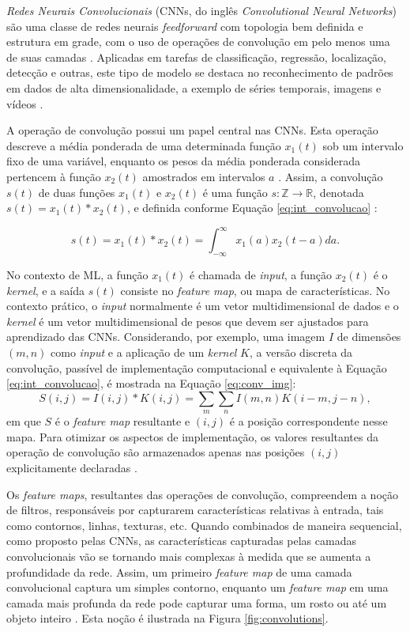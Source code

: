 \emph{Redes Neurais Convolucionais} (CNNs, do inglês \emph{Convolutional Neural Networks}) são uma classe de redes neurais \emph{feedforward} com topologia bem definida e estrutura em grade, com o uso de operações de convolução em pelo menos uma de suas camadas \cite{goodfellow2016deep}. Aplicadas em tarefas de classificação, regressão, localização, detecção e outras, este tipo de modelo se destaca no reconhecimento de padrões em dados de alta dimensionalidade, a exemplo de séries temporais, imagens e vídeos \cite{Khan:Livro}.

A operação de convolução possui um papel central nas CNNs. Esta operação descreve a média ponderada de uma determinada função $x_1(t)$ sob um intervalo fixo de uma variável, enquanto os pesos da média ponderada considerada pertencem à função $x_2(t)$ amostrados em intervalos $a$ \cite{bracewell1986fourier}. Assim, a convolução $s(t)$ de duas funções $x_1(t)$ e $x_2(t)$ é uma função $s: \mathds{Z} \rightarrow \mathds{R}$, denotada $s(t) = x_1(t) * x_2(t)$, e definida conforme Equação \ref{eq:int_convolucao} \cite{lathi2006sinais}:

\begin{equation}\label{eq:int_convolucao}
s(t) = x_1(t) * x_2(t) = \int_{-\infty}^{\infty} x_1(a) x_2(t-a)da.
\end{equation}

No contexto de ML, a função $x_1(t)$ é chamada de \emph{input}, a função $x_2(t)$ é o \emph{kernel}, e a saída $s(t)$ consiste no \emph{feature map}, ou mapa de características. No contexto prático, o \emph{input} normalmente é um vetor multidimensional de dados e o \emph{kernel} é um vetor multidimensional de pesos que devem ser ajustados para aprendizado das CNNs. Considerando, por exemplo, uma imagem $I$ de dimensões $(m,n)$ como \emph{input} e a aplicação de um \emph{kernel} $K$, a versão discreta da convolução, passível de implementação computacional e equivalente à Equação \ref{eq:int_convolucao}, é mostrada na Equação \ref{eq:conv_img}:
\begin{equation}
 S(i,j) = I(i,j)*K(i,j) = \sum_{m}\sum_{n}I(m,n)K(i-m,j-n),\label{eq:conv_img}
\end{equation}
em que $S$ é o \emph{feature map} resultante e $(i,j)$ é a posição correspondente nesse mapa. Para otimizar os aspectos de implementação, os valores resultantes da operação de convolução são armazenados apenas nas posições $(i,j)$ explicitamente declaradas \cite{goodfellow2016deep}.

Os \emph{feature maps}, resultantes das operações de convolução, compreendem a noção de filtros, responsáveis por capturarem características relativas à entrada, tais como contornos, linhas, texturas, etc. Quando combinados de maneira sequencial, como proposto pelas CNNs, as características capturadas pelas camadas convolucionais vão se tornando mais complexas à medida que se aumenta a profundidade da rede. Assim, um primeiro \emph{feature map} de uma camada convolucional captura um simples contorno, enquanto um \emph{feature map} em uma camada mais profunda da rede pode capturar uma forma, um rosto ou até um objeto inteiro \cite{Buduma:Livro}. Esta noção é ilustrada na Figura \ref{fig:convolutions}.

